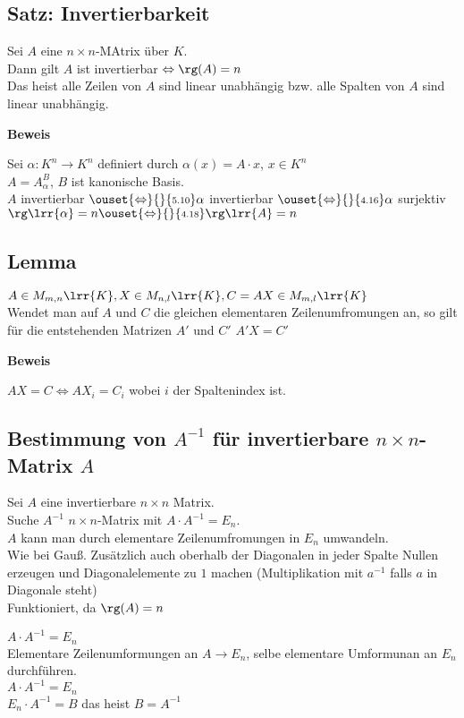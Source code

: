 \subsection{Satz: Invertierbarkeit}
	Sei $A$ eine $n\times n$-MAtrix über $K$.\\
	Dann gilt $A$ ist invertierbar $\Leftrightarrow\rg(A)=n$\\
	Das heist alle Zeilen von $A$ sind linear unabhängig bzw. alle Spalten von $A$ sind linear unabhängig.

	\textbf{Beweis}

	Sei $\alpha:K^n\rightarrow K^n$ definiert durch $\alpha(x)=A\cdot x$, $x\in K^n$\\
	$A=A_\alpha^B$, $B$ ist kanonische Basis.\\
	$A$ invertierbar $\ouset{\Leftrightarrow}{}{\mbox{\scriptsize 5.10}}\alpha$ invertierbar $\ouset{\Leftrightarrow}{}{\mbox{\scriptsize 4.16}}\alpha$ surjektiv $\rg\lrr{\alpha}=n\ouset{\Leftrightarrow}{}{\mbox{\scriptsize 4.18}}\rg\lrr{A}=n$

\subsection{Lemma}
	$A\in M_{m,n}\lrr{K}, X\in M_{n,l}\lrr{K}, C=AX\in M_{m,l}\lrr{K}$\\
	Wendet man auf $A$ und $C$ die gleichen elementaren Zeilenumfromungen an, so gilt für die entstehenden Matrizen $A'$ und $C'$ $A'X=C'$

	\textbf{Beweis}

	$AX=C\Leftrightarrow AX_i=C_i$ wobei $i$ der Spaltenindex ist.

\subsection{Bestimmung von \texorpdfstring{$A^{-1}$ für invertierbare $n\times n$- Matrix $A$}{invertierbarer Matrix}}
	Sei $A$ eine invertierbare $n\times n$ Matrix.\\
	Suche $A^{-1}$ $n\times n$-Matrix mit $A\cdot A^{-1}=E_n$.\\
	$A$ kann man durch elementare Zeilenumfromungen in $E_n$ umwandeln. \\
	Wie bei Gauß. Zusätzlich auch oberhalb der Diagonalen in jeder Spalte Nullen erzeugen und Diagonalelemente zu $1$ machen (Multiplikation mit $a^{-1}$ falls $a$ in Diagonale steht)\\
	Funktioniert, da $\rg(A)=n$

	$A\cdot A^{-1} =E_n$\\
	Elementare Zeilenumformungen an $A\rightarrow E_n$, selbe elementare Umformunan an $E_n$ durchführen.\\
	$A\cdot A^{-1} =E_n$\\
	$E_n\cdot A^{-1} = B$ das heist $B=A^{-1}$

